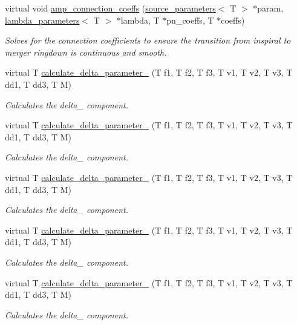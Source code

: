 \begin{DoxyCompactItemize}
virtual void \hyperlink{classIMRPhenomD_aa945ea05c7846632798d29c88ae85ac9}{amp\+\_\+connection\+\_\+coeffs} (\hyperlink{structsource__parameters}{source\+\_\+parameters}$<$ T $>$ $\ast$param, \hyperlink{structlambda__parameters}{lambda\+\_\+parameters}$<$ T $>$ $\ast$lambda, T $\ast$pn\+\_\+coeffs, T $\ast$coeffs)
\begin{DoxyCompactList}\small\item\em Solves for the connection coefficients to ensure the transition from inspiral to merger ringdown is continuous and smooth. \end{DoxyCompactList}\item 
virtual T \hyperlink{classIMRPhenomD_abd81c0aa321c96077823483c91ae01d4}{calculate\+\_\+delta\+\_\+parameter\+\_} (T f1, T f2, T f3, T v1, T v2, T v3, T dd1, T dd3, T M)
\begin{DoxyCompactList}\small\item\em Calculates the delta\+\_ component. \end{DoxyCompactList}\item 
virtual T \hyperlink{classIMRPhenomD_a6fd680e8cace47a635e7c3956dfb4b32}{calculate\+\_\+delta\+\_\+parameter\+\_} (T f1, T f2, T f3, T v1, T v2, T v3, T dd1, T dd3, T M)
\begin{DoxyCompactList}\small\item\em Calculates the delta\+\_ component. \end{DoxyCompactList}\item 
virtual T \hyperlink{classIMRPhenomD_acc1918553367dbe59ffb4959b0a0f5b2}{calculate\+\_\+delta\+\_\+parameter\+\_} (T f1, T f2, T f3, T v1, T v2, T v3, T dd1, T dd3, T M)
\begin{DoxyCompactList}\small\item\em Calculates the delta\+\_ component. \end{DoxyCompactList}\item 
virtual T \hyperlink{classIMRPhenomD_a4201abf06608c7a11adfee232f7eb581}{calculate\+\_\+delta\+\_\+parameter\+\_} (T f1, T f2, T f3, T v1, T v2, T v3, T dd1, T dd3, T M)
\begin{DoxyCompactList}\small\item\em Calculates the delta\+\_ component. \end{DoxyCompactList}\item 
virtual T \hyperlink{classIMRPhenomD_a22f9b0bc83c4ed555a46b03260c0d91d}{calculate\+\_\+delta\+\_\+parameter\+\_} (T f1, T f2, T f3, T v1, T v2, T v3, T dd1, T dd3, T M)
\begin{DoxyCompactList}\small\item\em Calculates the delta\+\_ component. \end{DoxyCompactList}\item 

\end{DoxyCompactItemize}
